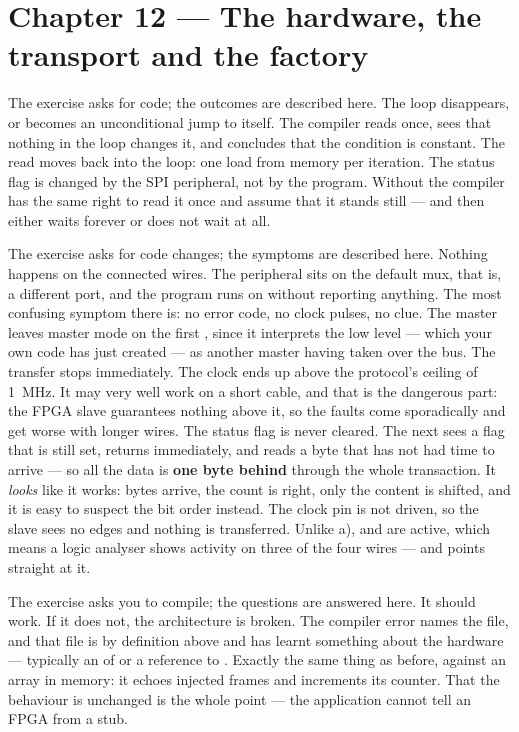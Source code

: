 \section*{Chapter 12 --- The hardware, the transport and the factory}

The exercise asks for code; the outcomes are described here.
 The loop disappears, or becomes an unconditional jump to itself. The compiler reads
 once, sees that nothing in the loop changes it, and concludes that the condition is
constant.
 The read moves back into the loop: one load from memory per iteration.
 The status flag is changed by the SPI peripheral, not by the program. Without
 the compiler has the same right to read it once and assume that it stands still
--- and then  either waits forever or does not wait at all.

The exercise asks for code changes; the symptoms are described here.
 Nothing happens on the connected wires. The peripheral sits on the default mux, that is, a
different port, and the program runs on without reporting anything. The most confusing symptom
there is: no error code, no clock pulses, no clue.
 The master leaves master mode on the first , since it interprets the low
 level --- which your own code has just created --- as another master having taken over
the bus. The transfer stops immediately.
 The clock ends up above the protocol's ceiling of 1~MHz. It may very well work on a short
cable, and that is the dangerous part: the FPGA slave guarantees nothing above it, so the faults
come sporadically and get worse with longer wires.
 The status flag is never cleared. The next  sees a flag that is still set,
returns immediately, and reads a byte that has not had time to arrive --- so all the data is
\textbf{one byte behind} through the whole transaction. It \emph{looks} like it works: bytes
arrive, the count is right, only the content is shifted, and it is easy to suspect the bit order
instead.
 The clock pin is not driven, so the slave sees no edges and nothing is transferred. Unlike
a),  and  are active, which means a logic analyser shows activity on three of
the four wires --- and points straight at it.

The exercise asks you to compile; the questions are answered here.
 It should work. If it does not, the architecture is broken.
 The compiler error names the file, and that file is by definition above
 and has learnt something about the hardware --- typically an
 of  or a reference to .
 Exactly the same thing as before, against an array in memory: it echoes injected frames
and increments its counter. That the behaviour is unchanged is the whole point --- the application
cannot tell an FPGA from a stub.

